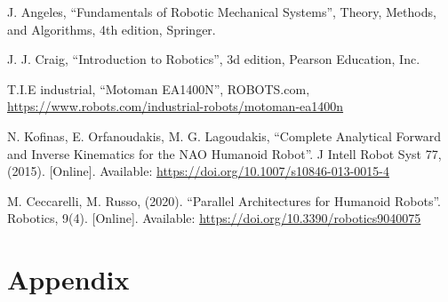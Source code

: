 \documentclass[conference]{IEEEtran}
\begin{document}
\begin{thebibliography}{00}
     J. Angeles, ``Fundamentals of Robotic Mechanical Systems'', Theory, Methods, and Algorithms, 4th edition, Springer.

     J. J. Craig, ``Introduction to Robotics'', 3d edition, Pearson Education, Inc.

     T.I.E industrial, ``Motoman EA1400N'', ROBOTS.com, \url{https://www.robots.com/industrial-robots/motoman-ea1400n}

     N. Kofinas, E. Orfanoudakis, M. G. Lagoudakis, ``Complete Analytical Forward and Inverse Kinematics for the NAO Humanoid Robot''. J Intell Robot Syst 77, (2015). [Online]. Available: \url{https://doi.org/10.1007/s10846-013-0015-4}

     M. Ceccarelli, M. Russo, (2020). ``Parallel Architectures for Humanoid Robots''. Robotics, 9(4). [Online]. Available: \url{https://doi.org/10.3390/robotics9040075}
\end{thebibliography}

\section{Appendix}
\end{document}
